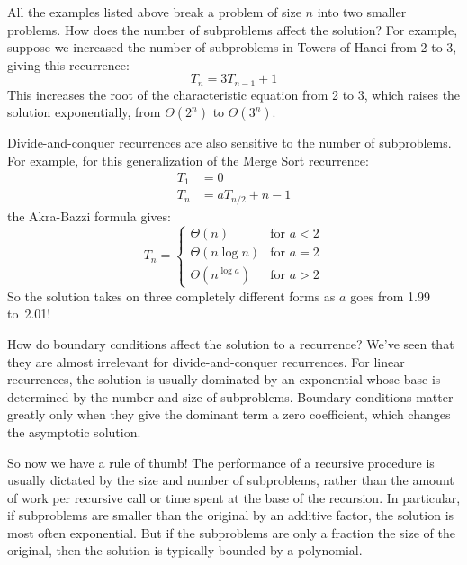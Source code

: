 All the examples listed above break a problem of size $n$ into two
smaller problems.  How does the number of subproblems affect the
solution?  For example, suppose we increased the number of subproblems
in Towers of Hanoi from 2 to 3, giving this recurrence:
\begin{equation*}
T_n = 3 T_{n-1} + 1
\end{equation*}
This increases the root of the characteristic equation from 2 to 3,
which raises the solution exponentially, from $\Theta(2^n)$ to
$\Theta(3^n)$.

Divide-and-conquer recurrences are also sensitive to the number of
subproblems.  For example, for this generalization of the Merge Sort
recurrence:
\begin{align*}
T_1 & = 0 \\
T_{n} & = a T_{n/2} + n - 1
\end{align*}
the Akra-Bazzi formula gives:
\begin{equation*}
T_n = \begin{cases}
\Theta(n) & \text{for $a < 2$} \\
\Theta(n \log n) & \text{for $a = 2$} \\
\Theta(n^{\log a}) & \text{for $a > 2$}
\end{cases}
\end{equation*}
So the solution takes on three completely different forms as $a$ goes
from 1.99 to~2.01!

How do boundary conditions affect the solution to a recurrence?  We've
seen that they are almost irrelevant for divide-and-conquer
recurrences.  For linear recurrences, the solution is usually
dominated by an exponential whose base is determined by the number and
size of subproblems.  Boundary conditions matter greatly only when
they give the dominant term a zero coefficient, which changes the
asymptotic solution.

So now we have a rule of thumb!  The performance of a recursive
procedure is usually dictated by the size and number of subproblems,
rather than the amount of work per recursive call or time spent at the
base of the recursion.  In particular, if subproblems are smaller than
the original by an additive factor, the solution is most often
exponential.  But if the subproblems are only a fraction the size of
the original, then the solution is typically bounded by a polynomial.

\endinput
